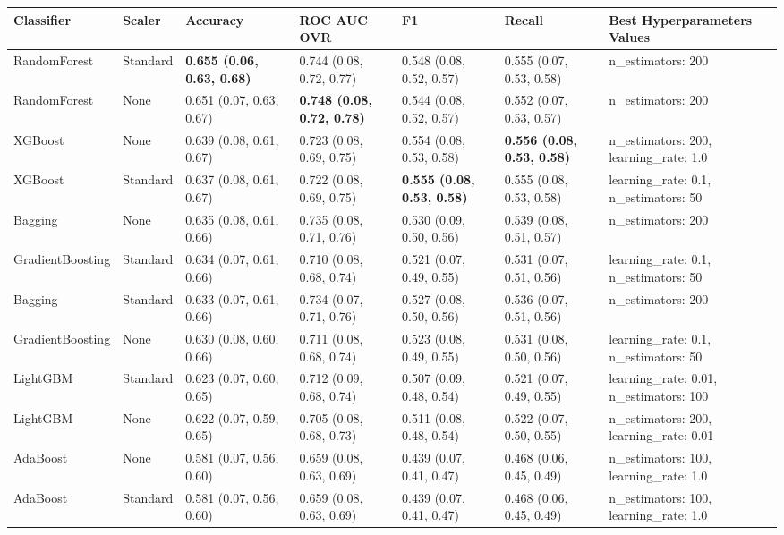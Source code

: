 \begin{tabular}{lllllll}
\toprule
Classifier & Scaler & Accuracy & ROC AUC OVR & F1 & Recall & Best Hyperparameters Values \\
\midrule
RandomForest & Standard & \textbf{0.655 (0.06, 0.63, 0.68)} & 0.744 (0.08, 0.72, 0.77) & 0.548 (0.08, 0.52, 0.57) & 0.555 (0.07, 0.53, 0.58) & {{n\_estimators: 200}} \\
RandomForest & None & 0.651 (0.07, 0.63, 0.67) & \textbf{0.748 (0.08, 0.72, 0.78)} & 0.544 (0.08, 0.52, 0.57) & 0.552 (0.07, 0.53, 0.57) & {{n\_estimators: 200}} \\
XGBoost & None & 0.639 (0.08, 0.61, 0.67) & 0.723 (0.08, 0.69, 0.75) & 0.554 (0.08, 0.53, 0.58) & \textbf{0.556 (0.08, 0.53, 0.58)} & {{n\_estimators: 200, learning\_rate: 1.0}} \\
XGBoost & Standard & 0.637 (0.08, 0.61, 0.67) & 0.722 (0.08, 0.69, 0.75) & \textbf{0.555 (0.08, 0.53, 0.58)} & 0.555 (0.08, 0.53, 0.58) & {{learning\_rate: 0.1, n\_estimators: 50}} \\
Bagging & None & 0.635 (0.08, 0.61, 0.66) & 0.735 (0.08, 0.71, 0.76) & 0.530 (0.09, 0.50, 0.56) & 0.539 (0.08, 0.51, 0.57) & {{n\_estimators: 200}} \\
GradientBoosting & Standard & 0.634 (0.07, 0.61, 0.66) & 0.710 (0.08, 0.68, 0.74) & 0.521 (0.07, 0.49, 0.55) & 0.531 (0.07, 0.51, 0.56) & {{learning\_rate: 0.1, n\_estimators: 50}} \\
Bagging & Standard & 0.633 (0.07, 0.61, 0.66) & 0.734 (0.07, 0.71, 0.76) & 0.527 (0.08, 0.50, 0.56) & 0.536 (0.07, 0.51, 0.56) & {{n\_estimators: 200}} \\
GradientBoosting & None & 0.630 (0.08, 0.60, 0.66) & 0.711 (0.08, 0.68, 0.74) & 0.523 (0.08, 0.49, 0.55) & 0.531 (0.08, 0.50, 0.56) & {{learning\_rate: 0.1, n\_estimators: 50}} \\
LightGBM & Standard & 0.623 (0.07, 0.60, 0.65) & 0.712 (0.09, 0.68, 0.74) & 0.507 (0.09, 0.48, 0.54) & 0.521 (0.07, 0.49, 0.55) & {{learning\_rate: 0.01, n\_estimators: 100}} \\
LightGBM & None & 0.622 (0.07, 0.59, 0.65) & 0.705 (0.08, 0.68, 0.73) & 0.511 (0.08, 0.48, 0.54) & 0.522 (0.07, 0.50, 0.55) & {{n\_estimators: 200, learning\_rate: 0.01}} \\
AdaBoost & None & 0.581 (0.07, 0.56, 0.60) & 0.659 (0.08, 0.63, 0.69) & 0.439 (0.07, 0.41, 0.47) & 0.468 (0.06, 0.45, 0.49) & {{n\_estimators: 100, learning\_rate: 1.0}} \\
AdaBoost & Standard & 0.581 (0.07, 0.56, 0.60) & 0.659 (0.08, 0.63, 0.69) & 0.439 (0.07, 0.41, 0.47) & 0.468 (0.06, 0.45, 0.49) & {{n\_estimators: 100, learning\_rate: 1.0}} \\

\end{tabular}
